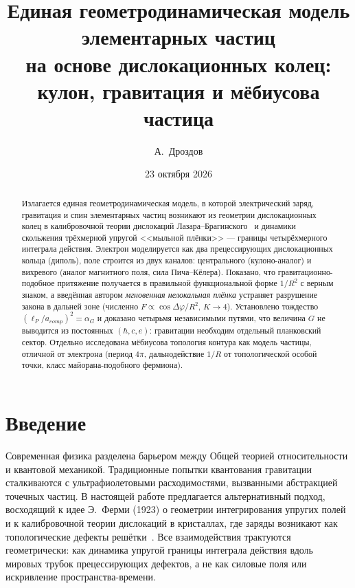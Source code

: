 \documentclass[11pt,a4paper]{article}
\title{Единая геометродинамическая модель элементарных частиц\\
на основе дислокационных колец:\\
кулон, гравитация и мёбиусова частица}
\author{А.~Дроздов}
\date{23 октября 2026}
\begin{document}
\maketitle

\begin{abstract}
Излагается единая геометродинамическая модель, в которой электрический
заряд, гравитация и спин элементарных частиц возникают из геометрии
дислокационных колец в калибровочной теории дислокаций Лазара--Брагинского~\cite{LazarDyn2010,Braginsky2018}
и динамики скольжения трёхмерной упругой <<мыльной плёнки>> --- границы
четырёхмерного интеграла действия. Электрон моделируется как два
прецессирующих дислокационных кольца (диполь), поле строится из двух
каналов: центрального (кулоно-аналог) и вихревого (аналог магнитного поля,
сила Пича--Кёлера). Показано, что гравитационно-подобное притяжение
получается в правильной функциональной форме $1/R^2$ с верным знаком, а
введённая автором \emph{мгновенная нелокальная плёнка} устраняет разрушение
закона в дальней зоне (численно $F\propto\cos\Delta\varphi/R^2$, $K\to4$).
Установлено тождество $(\ell_P/a_{comp})^2=\alpha_G$ и доказано четырьмя
независимыми путями, что величина $G$ не выводится из постоянных
$(\hbar,c,e)$: гравитации необходим отдельный планковский сектор.
Отдельно исследована мёбиусова топология контура как модель частицы,
отличной от электрона (период $4\pi$, дальнодействие $1/R$ от
топологической особой точки, класс майорана-подобного фермиона).
\end{abstract}

\tableofcontents

\section{Введение}
Современная физика разделена барьером между Общей теорией относительности
и квантовой механикой. Традиционные попытки квантования гравитации
сталкиваются с ультрафиолетовыми расходимостями, вызванными абстракцией
точечных частиц. В настоящей работе предлагается альтернативный подход,
восходящий к идее Э.~Ферми (1923) о геометрии интегрирования упругих полей~\cite{Fermi1923}
и к калибровочной теории дислокаций в кристаллах, где заряды возникают как
топологические дефекты решётки~\cite{KadicEdelen1983,LazarDyn2010}. Все взаимодействия трактуются геометрически:
как динамика упругой границы интеграла действия вдоль мировых трубок
прецессирующих дефектов, а не как силовые поля или искривление
пространства-времени.
\end{document}
